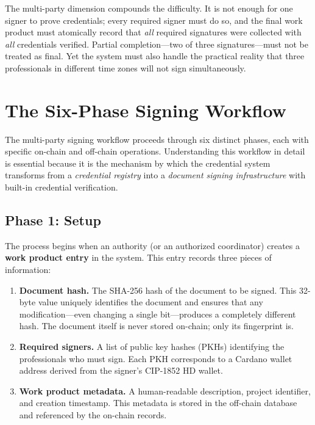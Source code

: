 The multi-party dimension compounds the difficulty.  It is not enough for one
signer to prove credentials; every required signer must do so, and the final
work product must atomically record that \emph{all} required signatures were
collected with \emph{all} credentials verified.  Partial completion---two of
three signatures---must not be treated as final.  Yet the system must also
handle the practical reality that three professionals in different time zones
will not sign simultaneously.


\section{The Six-Phase Signing Workflow}
\label{sec:six-phases}

The multi-party signing workflow proceeds through six distinct phases, each
with specific on-chain and off-chain operations.  Understanding this workflow
in detail is essential because it is the mechanism by which the credential
system transforms from a \emph{credential registry} into a \emph{document
signing infrastructure} with built-in credential verification.

\subsection{Phase 1: Setup}

The process begins when an authority (or an authorized coordinator) creates a
\textbf{work product entry} in the system.  This entry records three pieces of
information:

\begin{enumerate}[nosep]
  \item \textbf{Document hash.}  The SHA-256 hash of the document to be
    signed.  This 32-byte value uniquely identifies the document and ensures
    that any modification---even changing a single bit---produces a
    completely different hash.  The document itself is never stored on-chain;
    only its fingerprint is.
  \item \textbf{Required signers.}  A list of public key hashes (PKHs)
    identifying the professionals who must sign.  Each PKH corresponds to
    a Cardano wallet address derived from the signer's CIP-1852 HD wallet.
  \item \textbf{Work product metadata.}  A human-readable description,
    project identifier, and creation timestamp.  This metadata is stored in
    the off-chain database and referenced by the on-chain records.
\end{enumerate}


